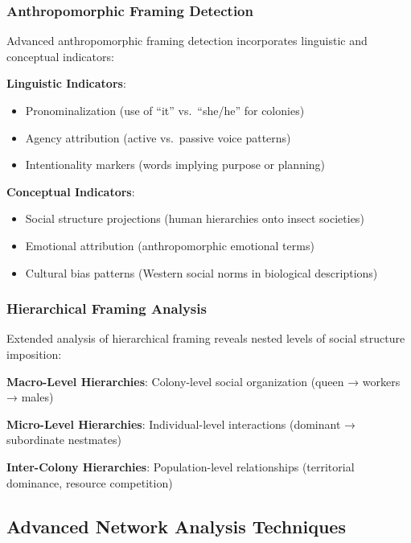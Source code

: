 \documentclass[
]{article}
\providecommand{\tightlist}{%
  \setlength{\itemsep}{0pt}\setlength{\parskip}{0pt}}
\numberwithin{equation}{section}
\begin{document}
\subsubsection{Anthropomorphic Framing
Detection}\label{anthropomorphic-framing-detection}

Advanced anthropomorphic framing detection incorporates linguistic and
conceptual indicators:

\textbf{Linguistic Indicators}:

\begin{itemize}
\tightlist
\item
  Pronominalization (use of ``it'' vs.~``she/he'' for colonies)
\item
  Agency attribution (active vs.~passive voice patterns)
\item
  Intentionality markers (words implying purpose or planning)
\end{itemize}

\textbf{Conceptual Indicators}:

\begin{itemize}
\tightlist
\item
  Social structure projections (human hierarchies onto insect societies)
\item
  Emotional attribution (anthropomorphic emotional terms)
\item
  Cultural bias patterns (Western social norms in biological
  descriptions)
\end{itemize}

\subsubsection{Hierarchical Framing
Analysis}\label{hierarchical-framing-analysis}

Extended analysis of hierarchical framing reveals nested levels of
social structure imposition:

\textbf{Macro-Level Hierarchies}: Colony-level social organization
(queen → workers → males)

\textbf{Micro-Level Hierarchies}: Individual-level interactions
(dominant → subordinate nestmates)

\textbf{Inter-Colony Hierarchies}: Population-level relationships
(territorial dominance, resource competition)

\subsection{Advanced Network Analysis
Techniques}\label{advanced-network-analysis-techniques}
\end{document}
